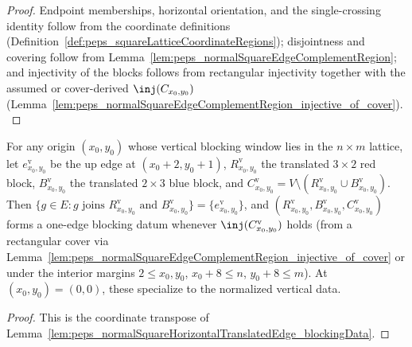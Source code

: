 \begin{proof}\leanok
    Endpoint memberships, horizontal orientation, and the single-crossing
    identity follow from the coordinate definitions
    (Definition~\ref{def:peps_squareLatticeCoordinateRegions}); disjointness
    and covering follow from
    Lemma~\ref{lem:peps_normalSquareEdgeComplementRegion}; and injectivity of
    the blocks follows from rectangular injectivity together with the assumed
    or cover-derived $\inj(C_{x_0,y_0})$
    (Lemma~\ref{lem:peps_normalSquareEdgeComplementRegion_injective_of_cover}).
\end{proof}

\begin{lemma}%
    \label{lem:peps_normalSquareVerticalTranslatedEdge_blockingData}
    \leanok
    For any origin $(x_0,y_0)$ whose vertical blocking window lies in the
    $n\times m$ lattice, let $e^{\mathrm v}_{x_0,y_0}$ be the up edge at
    $(x_0+2,y_0+1)$, $R^{\mathrm v}_{x_0,y_0}$ the translated $3\times 2$ red
    block, $B^{\mathrm v}_{x_0,y_0}$ the translated $2\times 3$ blue block, and
    $C^{\mathrm v}_{x_0,y_0}=V\setminus(R^{\mathrm v}_{x_0,y_0}\cup
        B^{\mathrm v}_{x_0,y_0})$. Then
    $\{g\in E:g\text{ joins }R^{\mathrm v}_{x_0,y_0}\text{ and }B^{\mathrm v}_{x_0,y_0}\}=\{e^{\mathrm v}_{x_0,y_0}\}$,
    and $(R^{\mathrm v}_{x_0,y_0},B^{\mathrm v}_{x_0,y_0},C^{\mathrm v}_{x_0,y_0})$
    forms a one-edge blocking datum whenever $\inj(C^{\mathrm v}_{x_0,y_0})$
    holds (from a rectangular cover via
    Lemma~\ref{lem:peps_normalSquareEdgeComplementRegion_injective_of_cover} or
    under the interior margins $2\le x_0,y_0$, $x_0+8\le n$, $y_0+8\le m$).
    At $(x_0,y_0)=(0,0)$, these specialize to the normalized vertical data.
\end{lemma}
\begin{proof}\leanok
    This is the coordinate transpose of
    Lemma~\ref{lem:peps_normalSquareHorizontalTranslatedEdge_blockingData}.
\end{proof}

